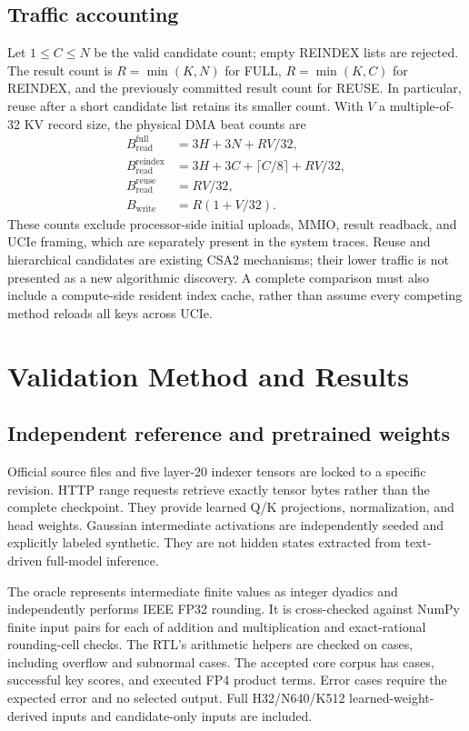 \documentclass[conference]{IEEEtran}
\begin{document}
\subsection{Traffic accounting}
Let $1\le C\le N$ be the valid candidate count; empty REINDEX lists are rejected. The result count is $R=\min(K,N)$ for FULL, $R=\min(K,C)$ for REINDEX, and the previously committed result count for REUSE. In particular, reuse after a short candidate list retains its smaller count. With $V$ a multiple-of-32 KV record size, the physical DMA beat counts are
\begin{align}
 B^\mathrm{full}_\mathrm{read}&=3H+3N+RV/32,\\
 B^\mathrm{reindex}_\mathrm{read}&=3H+3C+\lceil C/8\rceil+RV/32,\\
 B^\mathrm{reuse}_\mathrm{read}&=RV/32,\\
 B_\mathrm{write}&=R(1+V/32).
\end{align}
These counts exclude processor-side initial uploads, MMIO, result readback, and UCIe framing, which are separately present in the system traces. Reuse and hierarchical candidates are existing CSA2 mechanisms; their lower traffic is not presented as a new algorithmic discovery. A complete comparison must also include a compute-side resident index cache, rather than assume every competing method reloads all keys across UCIe.

\section{Validation Method and Results}
\subsection{Independent reference and pretrained weights}
Official source files and five layer-20 indexer tensors are locked to a specific revision. HTTP range requests retrieve exactly \TensorBytes{} tensor bytes rather than the complete checkpoint. They provide learned Q/K projections, normalization, and head weights. Gaussian intermediate activations are independently seeded and explicitly labeled synthetic. They are not hidden states extracted from text-driven full-model inference.

The oracle represents intermediate finite values as integer dyadics and independently performs IEEE FP32 rounding. It is cross-checked against \OraclePairCount{} NumPy finite input pairs for each of addition and multiplication and \RationalCaseCount{} exact-rational rounding-cell checks. The RTL's arithmetic helpers are checked on \FpCaseCount{} cases, including overflow and subnormal cases. The accepted core corpus has \CoreCaseCount{} cases, \CoreKeyCount{} successful key scores, and \CoreMacCount{} executed FP4 product terms. Error cases require the expected error and no selected output. Full H32/N640/K512 learned-weight-derived inputs and candidate-only inputs are included.
\end{document}
